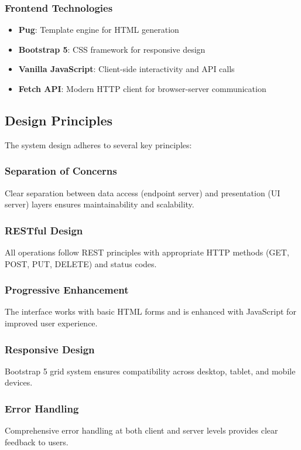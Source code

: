 \documentclass[11pt,a4paper]{article}
\begin{document}
\subsubsection{Frontend Technologies}
\begin{itemize}
    \item \textbf{Pug}: Template engine for HTML generation
    \item \textbf{Bootstrap 5}: CSS framework for responsive design
    \item \textbf{Vanilla JavaScript}: Client-side interactivity and API calls
    \item \textbf{Fetch API}: Modern HTTP client for browser-server communication
\end{itemize}

\subsection{Design Principles}

The system design adheres to several key principles:

\subsubsection{Separation of Concerns}
Clear separation between data access (endpoint server) and presentation (UI server) layers ensures maintainability and scalability.

\subsubsection{RESTful Design}
All operations follow REST principles with appropriate HTTP methods (GET, POST, PUT, DELETE) and status codes.

\subsubsection{Progressive Enhancement}
The interface works with basic HTML forms and is enhanced with JavaScript for improved user experience.

\subsubsection{Responsive Design}
Bootstrap 5 grid system ensures compatibility across desktop, tablet, and mobile devices.

\subsubsection{Error Handling}
Comprehensive error handling at both client and server levels provides clear feedback to users.
\end{document}

